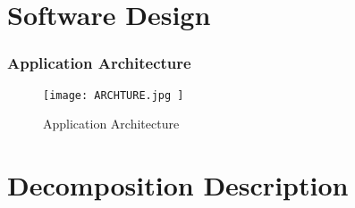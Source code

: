 
\section{Software Design}
\subsubsection{Application Architecture }
\begin{figure}[H]
    \texttt{[image: ARCHTURE.jpg ]}
    \caption{ Application Architecture}
    \label{fig:Application-Architecture}
\end{figure}

\section[]{Decomposition Description}

